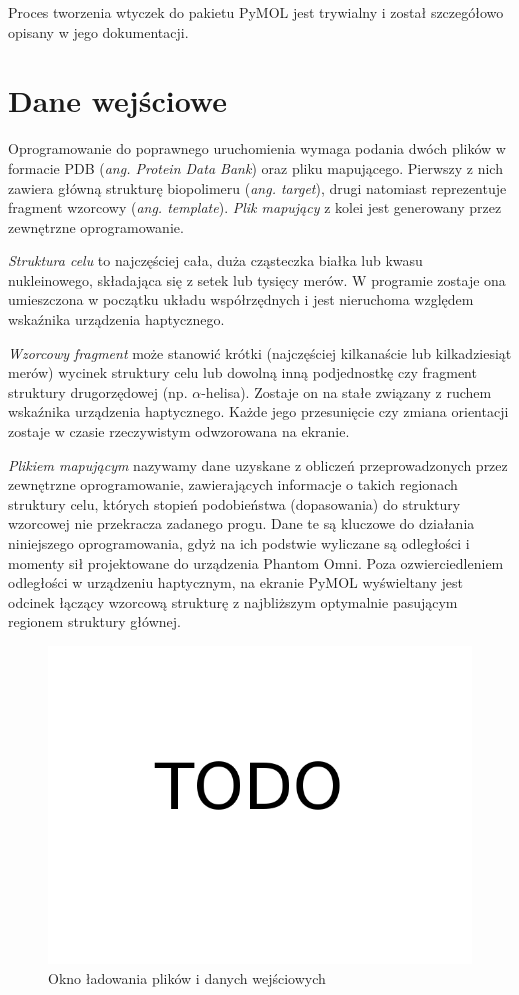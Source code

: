 \documentclass[licencjacka]{pracamgr}
\begin{document}
Proces tworzenia wtyczek do pakietu PyMOL jest trywialny i został szczegółowo opisany w jego dokumentacji. 

\section{Dane wejściowe}
Oprogramowanie do poprawnego uruchomienia wymaga podania dwóch plików w formacie PDB (\textit{ang. Protein Data Bank}) oraz pliku mapującego. Pierwszy z nich zawiera główną strukturę biopolimeru (\textit{ang. target}), drugi natomiast reprezentuje fragment wzorcowy (\textit{ang. template}). \textit{Plik mapujący} z kolei jest generowany przez zewnętrzne oprogramowanie.

\textit{Struktura celu} to najczęściej cała, duża cząsteczka białka lub kwasu nukleinowego, składająca się z setek lub tysięcy merów. W programie zostaje ona umieszczona w początku układu współrzędnych i jest nieruchoma względem wskaźnika urządzenia haptycznego.

\textit{Wzorcowy fragment} może stanowić krótki (najczęściej kilkanaście lub kilkadziesiąt merów) wycinek struktury celu lub dowolną inną podjednostkę czy fragment struktury drugorzędowej (np. $\alpha$-helisa). Zostaje on na stałe związany z ruchem wskaźnika urządzenia haptycznego. Każde jego przesunięcie czy zmiana orientacji zostaje w czasie rzeczywistym odwzorowana na ekranie. 

\textit{Plikiem mapującym} nazywamy dane uzyskane z obliczeń przeprowadzonych przez zewnętrzne oprogramowanie, zawierających informacje o takich regionach struktury celu, których stopień podobieństwa (dopasowania) do struktury wzorcowej nie przekracza zadanego progu. Dane te są kluczowe do działania niniejszego oprogramowania, gdyż na ich podstwie wyliczane są odległości i momenty sił projektowane do urządzenia Phantom Omni. Poza ozwierciedleniem odległości w urządzeniu haptycznym, na ekranie PyMOL wyświeltany jest odcinek łączący wzorcową strukturę z najbliższym optymalnie pasującym regionem struktury głównej.

\begin{figure}[H]
\centering
\includegraphics[scale=0.3,center]{todo}
\caption{Okno ładowania plików i danych wejściowych}
\end{figure}
\end{document}
